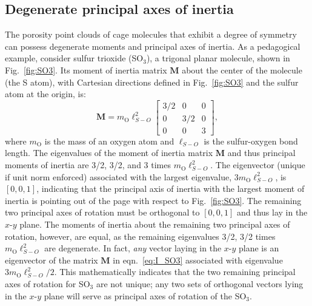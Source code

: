 \documentclass[journal=jacsat,manuscript=article]{achemso}
\begin{document}
\subsection{Degenerate principal axes of inertia}
\label{sec:degenerate}
The porosity point clouds of cage molecules that exhibit a degree of symmetry can possess degenerate moments and principal axes of inertia. As a pedagogical example, consider sulfur trioxide (SO$_3$), a trigonal planar molecule, shown in Fig.~\ref{fig:SO3}. Its moment of inertia matrix $\mathbf{M}$ about the center of the molecule (the S atom), with Cartesian directions defined in Fig.~\ref{fig:SO3} and the sulfur atom at the origin, is:
\begin{equation}
\mathbf{M} = m_{\text{O}} \ell_{S-O}^2
  \begin{bmatrix}
    3/2 & 0 & 0 \\
    0 & 3/2 & 0 \\
    0 & 0 & 3
  \end{bmatrix}, \label{eq:I_SO3}
\end{equation} where $m_{\text{O}}$ is the mass of an oxygen atom and $\ell_{S-O}$ is the sulfur-oxygen bond length. The eigenvalues of the moment of inertia matrix $\mathbf{M}$ and thus principal moments of inertia are 3/2, 3/2, and 3 times $m_{\text{O}} \ell_{S-O}^2$. The eigenvector (unique if unit norm enforced) associated with the largest eigenvalue, $3 m_{\text{O}} \ell_{S-O}^2$, is $[0, 0, 1]$, indicating that the principal axis of inertia with the largest moment of inertia is pointing out of the page with respect to Fig.~\ref{fig:SO3}. The remaining two principal axes of rotation must be orthogonal to $[0, 0, 1]$ and thus lay in the $x$-$y$ plane. The moments of inertia about the remaining two principal axes of rotation, however, are equal, as the remaining eigenvalues 3/2, 3/2 times $m_{\text{O}} \ell_{S-O}^2$ are degenerate. In fact, \emph{any} vector laying in the $x$-$y$ plane is an eigenvector of the matrix $\mathbf{M}$ in eqn.~\ref{eq:I_SO3} associated with eigenvalue $3m_{\text{O}} \ell_{S-O}^2/2$. This mathematically indicates that the two remaining principal axes of rotation for SO$_3$ are not unique; any two sets of orthogonal vectors lying in the $x$-$y$ plane will serve as principal axes of rotation of the SO$_3$.
\end{document}
